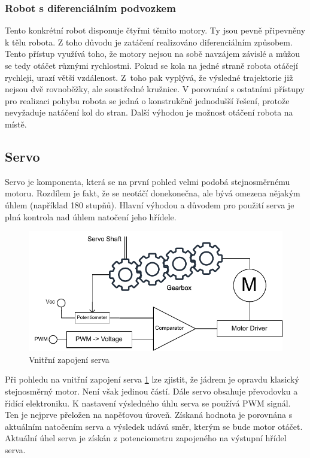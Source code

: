 \subsubsection{Robot s diferenciálním podvozkem}
Tento konkrétní robot disponuje čtyřmi těmito motory. Ty jsou pevně připevněny k tělu robota. Z toho důvodu je zatáčení realizováno diferenciálním způsobem. Tento přístup využívá toho, že motory nejsou na sobě navzájem závislé a můžou se tedy otáčet různými rychlostmi. Pokud se kola na jedné straně robota otáčejí rychleji, urazí větší vzdálenost. Z~toho pak vyplývá, že výsledné trajektorie již nejsou dvě rovnoběžky, ale soustředné kružnice. V porovnání s ostatními přístupy pro realizaci pohybu robota se jedná o konstrukčně jednodušší řešení, protože nevyžaduje natáčení kol do stran. Další výhodou je možnost otáčení robota na místě. \cite[str:~5]{embeded_robotics}

\subsection*{Servo}
Servo je komponenta, která se na první pohled velmi podobá stejnosměrnému motoru. Rozdílem je fakt, že se neotáčí donekonečna, ale bývá omezena nějakým úhlem (například 180 stupňů). Hlavní výhodou a důvodem pro použití serva je plná kontrola nad úhlem natočení jeho hřídele.\cite[str:~119-121]{embeded_robotics}

\begin{figure}[h!]
	\centering
	\includegraphics[scale=0.9]{obrazky-figures/servo.pdf}
	\caption{Vnitřní zapojení serva}
	\label{fig:servo}
\end{figure}

Při pohledu na vnitřní zapojení serva \ref{fig:servo} lze zjistit, že jádrem je opravdu klasický stejnosměrný motor. Není však jedinou částí. Dále servo obsahuje převodovku a řídící elektroniku. K nastavení výsledného úhlu serva se používá PWM signál. Ten je nejprve přeložen na napěťovou úroveň. Získaná hodnota je porovnána s aktuálním natočením serva a výsledek udává směr, kterým se bude motor otáčet. Aktuální úhel serva je získán z potenciometru zapojeného na výstupní hřídel serva. \cite[str:~89-90]{mobilní_roboty}

